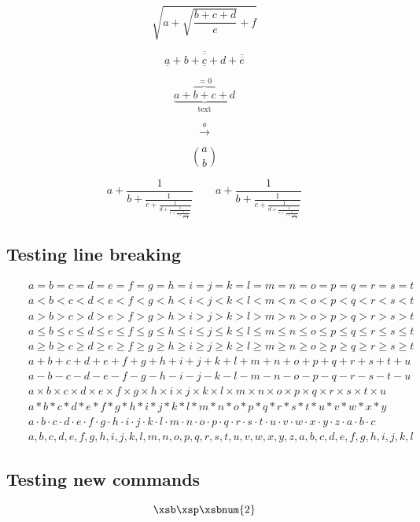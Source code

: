 \[
\sqrt{a + \sqrt{\frac{b + c + d}{e}} + f}
\]

\[
\overline{\underline{a} + \overline{b + \underline{c} + d} + \overline{\overline{e}}}
\]

\[
\underbrace{a + \overbrace{b + c}^{=0} + d}_{\mbox{text}}
\]

\[
\stackrel{a}{\longrightarrow}
\]

\[
\binom{a }{ b}
\]

\[
a + \frac{1}{b + \frac{1}{c + \frac{1}{d + \frac{1}{e + \frac{1}{f + \frac{1}{g + \frac{1}{h}}}}}}} \qquad a + \frac{1}{\displaystyle b + \frac{1}{\displaystyle c + \frac{1}{\displaystyle d + \frac{1}{\displaystyle e + \frac{1}{\displaystyle f + \frac{1}{\displaystyle g + \frac{1}{h}}}}}}}
\]

\subsection{Testing line breaking}

\begin{eqnarray*}
&&a = b = c = d = e = f = g = h = i = j = k = l = m = n = o = p = q = r = s = t\\
&&a < b < c < d < e < f < g < h < i < j < k < l < m < n < o < p < q < r < s < t\\
&&a > b > c > d > e > f > g > h > i > j > k > l > m > n > o > p > q > r > s > t\\
&&a \leq b \leq c \leq d \leq e \leq f \leq g \leq h \leq i \leq j \leq k \leq l \leq m \leq n \leq o \leq p \leq q \leq r \leq s \leq t\\
&&a \geq b \geq c \geq d \geq e \geq f \geq g \geq h \geq i \geq j \geq k \geq l \geq m \geq n \geq o \geq p \geq q \geq r \geq s \geq t\\
&&a + b + c + d + e + f + g + h + i + j + k + l + m + n + o + p + q + r + s + t + u\\
&&a - b - c - d - e - f - g - h - i - j - k - l - m - n - o - p - q - r - s - t - u\\
&&a \times b \times c \times d \times e \times f \times g \times h \times i \times j \times k \times l \times m \times n \times o \times p \times q \times r \times s \times t \times u\\
&&a * b * c * d * e * f * g * h * i * j * k * l * m * n * o * p * q * r * s * t * u * v * w * x * y\\
&&a \cdot b \cdot c \cdot d \cdot e \cdot f \cdot g \cdot h \cdot i \cdot j \cdot k \cdot l \cdot m \cdot n \cdot o \cdot p \cdot q \cdot r \cdot s \cdot t \cdot u \cdot v \cdot w \cdot x \cdot y \cdot z \cdot a \cdot b \cdot c\\
&&a , b , c , d , e , f , g , h , i , j , k , l , m , n , o , p , q , r , s , t , u , v , w , x , y , z , a , b , c , d , e , f, g , h , i , j , k , l
\end{eqnarray*}

\subsection{Testing new commands\label{test}}
\[ 
\xsb \xsp \xsbnum{2}
\]

